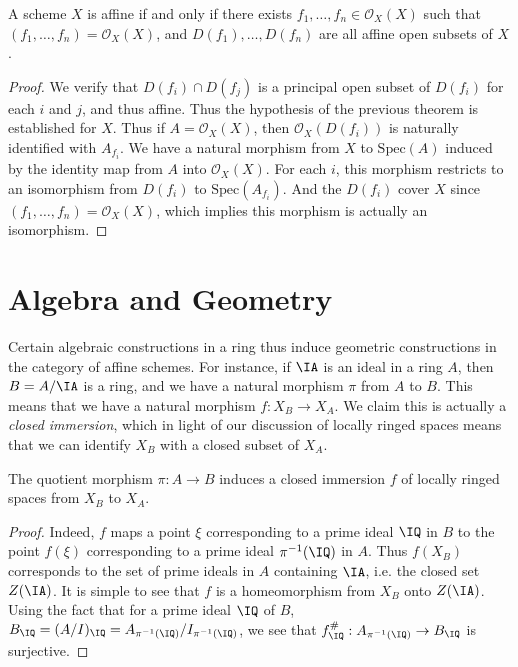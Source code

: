 \begin{corollary}
    A scheme $X$ is affine if and only if there exists $f_1,\dots,f_n \in \mathcal{O}_X(X)$ such that $(f_1,\dots,f_n) = \mathcal{O}_X(X)$, and $D(f_1), \dots, D(f_n)$ are all affine open subsets of $X$.
\end{corollary}
\begin{proof}
    We verify that $D(f_i) \cap D(f_j)$ is a principal open subset of $D(f_i)$ for each $i$ and $j$, and thus affine. Thus the hypothesis of the previous theorem is established for $X$. Thus if $A = \mathcal{O}_X(X)$, then $\mathcal{O}_X(D(f_i))$ is naturally identified with $A_{f_i}$. We have a natural morphism from $X$ to $\text{Spec}(A)$ induced by the identity map from $A$ into $\mathcal{O}_X(X)$. For each $i$, this morphism restricts to an isomorphism from $D(f_i)$ to $\text{Spec}(A_{f_i})$. And the $D(f_i)$ cover $X$ since $(f_1,\dots,f_n) = \mathcal{O}_X(X)$, which implies this morphism is actually an isomorphism.
\end{proof}

\section{Algebra and Geometry}

Certain algebraic constructions in a ring thus induce geometric constructions in the category of affine schemes. For instance, if $\IA$ is an ideal in a ring $A$, then $B = A/\IA$ is a ring, and we have a natural morphism $\pi$ from $A$ to $B$. This means that we have a natural morphism $f: X_B \to X_A$. We claim this is actually a \emph{closed immersion}, which in light of our discussion of locally ringed spaces means that we can identify $X_B$ with a closed subset of $X_A$.

\begin{lemma}
    The quotient morphism $\pi: A \to B$ induces a closed immersion $f$ of locally ringed spaces from $X_B$ to $X_A$.
\end{lemma}
\begin{proof}
    Indeed, $f$ maps a point $\xi$ corresponding to a prime ideal $\IQ$ in $B$ to the point $f(\xi)$ corresponding to a prime ideal $\pi^{-1}(\IQ)$ in $A$. Thus $f(X_B)$ corresponds to the set of prime ideals in $A$ containing $\IA$, i.e. the closed set $Z(\IA)$. It is simple to see that $f$ is a homeomorphism from $X_B$ onto $Z(\IA)$. Using the fact that for a prime ideal $\IQ$ of $B$, $B_{\IQ} = (A/I)_{\IQ} = A_{\pi^{-1}(\IQ)} / I_{\pi^{-1}(\IQ)}$, we see that $f^\#_{\IQ}: A_{\pi^{-1}(\IQ)} \to B_{\IQ}$ is surjective.
\end{proof}

